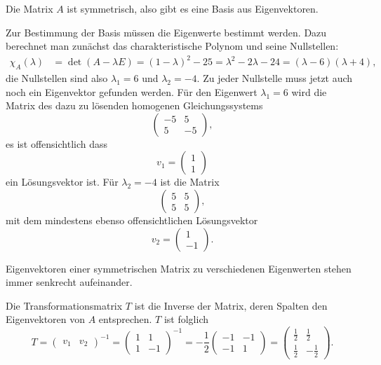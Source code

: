 \begin{loesung}
\begin{teilaufgaben}
\item
Die Matrix $A$ ist symmetrisch, also gibt es eine Basis aus
Eigenvektoren.
\item
Zur Bestimmung der Basis müssen die Eigenwerte bestimmt werden.
Dazu berechnet man zunächst das charakteristische Polynom und
seine Nullstellen:
\begin{align*}
\chi_A(\lambda)
&=\det(A-\lambda E)=(1-\lambda)^2-25=\lambda^2-2\lambda -24
=(\lambda-6)(\lambda +4),
\end{align*}
die Nullstellen sind also $\lambda_1=6$ und $\lambda_2=-4$. Zu jeder
Nullstelle muss jetzt auch noch ein Eigenvektor gefunden werden.
Für den Eigenwert $\lambda_1=6$ wird die Matrix des dazu zu lösenden
homogenen Gleichungssystems
\[
\begin{pmatrix}-5&5\\5&-5\end{pmatrix},
\]
es ist offensichtlich dass
\[
v_1=\begin{pmatrix}1\\1\end{pmatrix}
\]
ein Lösungsvektor ist. Für $\lambda_2=-4$ ist die Matrix
\[
\begin{pmatrix}5&5\\5&5\end{pmatrix},
\]
mit dem mindestens ebenso offensichtlichen Lösungsvektor
\[
v_2=\begin{pmatrix}1\\-1\end{pmatrix}.
\]
\item
Eigenvektoren einer symmetrischen Matrix zu verschiedenen Eigenwerten
stehen immer senkrecht aufeinander.
\item Die Transformationsmatrix $T$ ist die Inverse der Matrix, deren Spalten den Eigenvektoren von $A$ entsprechen. $T$ ist folglich
\[
    T = \begin{pmatrix}v_1 & v_2 \end{pmatrix}^{-1} = \begin{pmatrix}1 & 1\\ 1 & -1 \end{pmatrix}^{-1} = -\dfrac{1}{2}\begin{pmatrix}-1 & -1\\ -1 & 1 \end{pmatrix} = \begin{pmatrix}\frac{1}{2} & \frac{1}{2}\\ \frac{1}{2} & -\frac{1}{2} \end{pmatrix}.
\]
\end{teilaufgaben}
\end{loesung}
